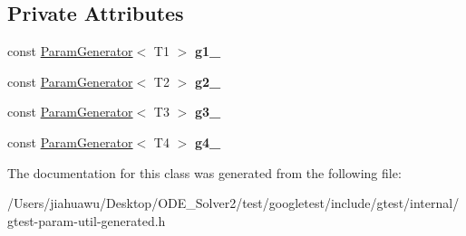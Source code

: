\subsection*{Private Attributes}
\begin{DoxyCompactItemize}
\item 
\mbox{\label{classtesting_1_1internal_1_1_cartesian_product_generator4_a916a14456616d2be5f7c0185d6917aeb}} 
const \mbox{\hyperlink{classtesting_1_1internal_1_1_param_generator}{Param\+Generator}}$<$ T1 $>$ {\bfseries g1\+\_\+}
\item 
\mbox{\label{classtesting_1_1internal_1_1_cartesian_product_generator4_aa54ef550ea4f6daa98177faee4cab9fb}} 
const \mbox{\hyperlink{classtesting_1_1internal_1_1_param_generator}{Param\+Generator}}$<$ T2 $>$ {\bfseries g2\+\_\+}
\item 
\mbox{\label{classtesting_1_1internal_1_1_cartesian_product_generator4_a8b76a441b940b79dc96ce0d5ae30c70b}} 
const \mbox{\hyperlink{classtesting_1_1internal_1_1_param_generator}{Param\+Generator}}$<$ T3 $>$ {\bfseries g3\+\_\+}
\item 
\mbox{\label{classtesting_1_1internal_1_1_cartesian_product_generator4_ac9de33013a5030a368c30bd4029beea1}} 
const \mbox{\hyperlink{classtesting_1_1internal_1_1_param_generator}{Param\+Generator}}$<$ T4 $>$ {\bfseries g4\+\_\+}
\end{DoxyCompactItemize}


The documentation for this class was generated from the following file\+:\begin{DoxyCompactItemize}
\item 
/\+Users/jiahuawu/\+Desktop/\+O\+D\+E\+\_\+\+Solver2/test/googletest/include/gtest/internal/gtest-\/param-\/util-\/generated.\+h\end{DoxyCompactItemize}
